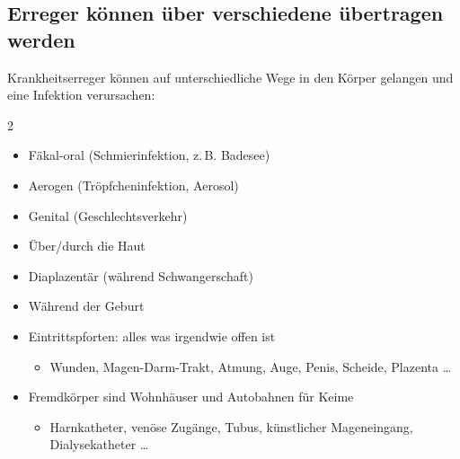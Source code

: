 

\subsection{Erreger können über verschiedene  übertragen werden}
\label{topic:infektion-uebertragungswege}



Krankheitserreger können auf unterschiedliche Wege in den
Körper gelangen und eine Infektion verursachen:

\begin{multicols}{2}
  \begin{itemize}
    \item Fäkal-oral (Schmierinfektion, z.\,B. Badesee)
    \item Aerogen (Tröpfcheninfektion, Aerosol)
    \item Genital (Geschlechtsverkehr)
    \item Über/durch die Haut
    \item Diaplazentär (während Schwangerschaft)
    \item Während der Geburt
    \item Eintrittspforten: alles was irgendwie offen ist
    \begin{itemize}
      \item Wunden, Magen-Darm-Trakt, Atmung, Auge,
      Penis, Scheide,
      Plazenta
      \ldots
    \end{itemize}
    \item Fremdkörper sind Wohnhäuser und Autobahnen für Keime
    \begin{itemize}
      \item Harnkatheter, venöse Zugänge, Tubus, künstlicher
      Mageneingang, Dialysekatheter {\dots}
    \end{itemize}
  \end{itemize}
\end{multicols}




